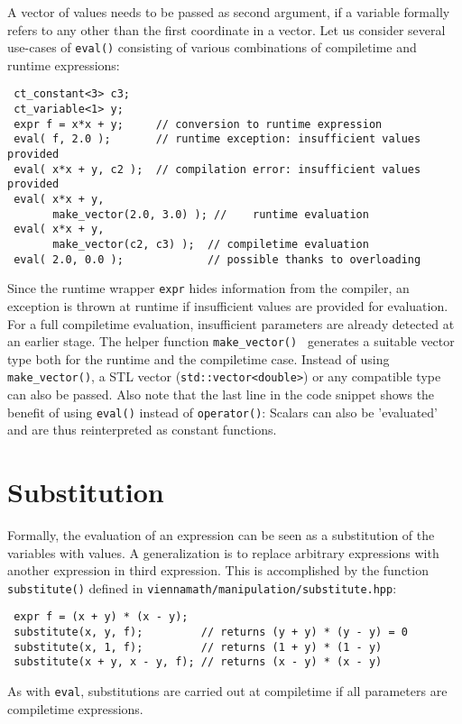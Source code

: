 A vector of values needs to be passed as second argument, if a variable formally refers to any other than the first coordinate in a vector.
Let us consider several use-cases of \lstinline|eval()| consisting of various combinations of compiletime and runtime expressions:
\begin{lstlisting}
 ct_constant<3> c3;
 ct_variable<1> y;
 expr f = x*x + y;     // conversion to runtime expression
 eval( f, 2.0 );       // runtime exception: insufficient values provided
 eval( x*x + y, c2 );  // compilation error: insufficient values provided
 eval( x*x + y,
       make_vector(2.0, 3.0) ); //    runtime evaluation
 eval( x*x + y,
       make_vector(c2, c3) );  // compiletime evaluation
 eval( 2.0, 0.0 );             // possible thanks to overloading
\end{lstlisting}
Since the runtime wrapper \lstinline|expr| hides information from the compiler, an exception is thrown at runtime if insufficient values are provided for evaluation.
For a full compiletime evaluation, insufficient parameters are already detected at an earlier stage.
The helper function \lstinline|make_vector() | generates a suitable vector type both for the runtime and the compiletime case.
Instead of using \lstinline|make_vector()|, a STL vector (\lstinline|std::vector<double>|) or any compatible type can also be passed.
Also note that the last line in the code snippet shows the benefit of using \lstinline|eval()| instead of \lstinline|operator()|:
Scalars can also be 'evaluated' and are thus reinterpreted as constant functions.

 \section{Substitution}
Formally, the evaluation of an expression can be seen as a substitution of the variables with values.
A generalization is to replace arbitrary expressions with another expression in third expression.
This is accomplished by the function \lstinline|substitute()| defined in \lstinline|viennamath/manipulation/substitute.hpp|:
\begin{lstlisting}
 expr f = (x + y) * (x - y);
 substitute(x, y, f);         // returns (y + y) * (y - y) = 0
 substitute(x, 1, f);         // returns (1 + y) * (1 - y)
 substitute(x + y, x - y, f); // returns (x - y) * (x - y)
\end{lstlisting}
As with \lstinline|eval|, substitutions are carried out at compiletime if all parameters are compiletime expressions.


